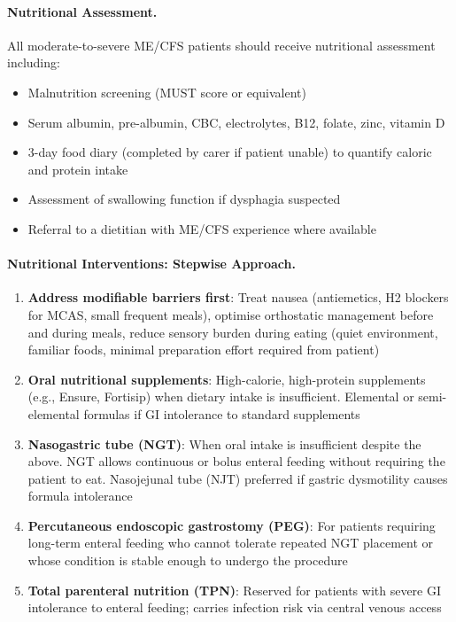 \paragraph{Nutritional Assessment.}
All moderate-to-severe ME/CFS patients should receive nutritional assessment including:

\begin{itemize}
    \item Malnutrition screening (MUST score or equivalent)
    \item Serum albumin, pre-albumin, CBC, electrolytes, B12, folate, zinc, vitamin D
    \item 3-day food diary (completed by carer if patient unable) to quantify caloric and protein intake
    \item Assessment of swallowing function if dysphagia suspected
    \item Referral to a dietitian with ME/CFS experience where available
\end{itemize}

\paragraph{Nutritional Interventions: Stepwise Approach.}

\begin{enumerate}
    \item \textbf{Address modifiable barriers first}: Treat nausea (antiemetics, H2 blockers for MCAS, small frequent meals), optimise orthostatic management before and during meals, reduce sensory burden during eating (quiet environment, familiar foods, minimal preparation effort required from patient)

    \item \textbf{Oral nutritional supplements}: High-calorie, high-protein supplements (e.g., Ensure, Fortisip) when dietary intake is insufficient. Elemental or semi-elemental formulas if GI intolerance to standard supplements

    \item \textbf{Nasogastric tube (NGT)}: When oral intake is insufficient despite the above. NGT allows continuous or bolus enteral feeding without requiring the patient to eat. Nasojejunal tube (NJT) preferred if gastric dysmotility causes formula intolerance

    \item \textbf{Percutaneous endoscopic gastrostomy (PEG)}: For patients requiring long-term enteral feeding who cannot tolerate repeated NGT placement or whose condition is stable enough to undergo the procedure

    \item \textbf{Total parenteral nutrition (TPN)}: Reserved for patients with severe GI intolerance to enteral feeding; carries infection risk via central venous access
\end{enumerate}

